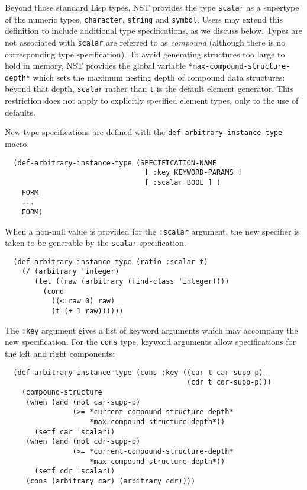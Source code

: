 Beyond those standard Lisp types, NST provides the type
\texttt{scalar} as a supertype of the numeric types,
\texttt{character}, \texttt{string} and \texttt{symbol}.  Users may
extend this definition to include additional type specifications, as
we discuss below.  Types are not associated with \texttt{scalar} are
referred to as \emph{compound} (although there is no corresponding
type specification).  To avoid generating structures too large to hold
in memory, NST provides the global variable
\texttt{*max-compound-structure-depth*}\label{max-compound-structure-depth}
which sets the maximum nesting depth of compound data structures:
beyond that depth, \texttt{scalar} rather than \texttt{t} is the
default element generator.  This restriction does not apply to
explicitly specified element types, only to the use of defaults.

New type specifications are defined with the
\texttt{def-arbitrary-instance-type}
macro.
\label{def-arbitrary-instance-type}
\begin{verbatim}
  (def-arbitrary-instance-type (SPECIFICATION-NAME
                                 [ :key KEYWORD-PARAMS ]
                                 [ :scalar BOOL ] )
    FORM
    ...
    FORM)
\end{verbatim}
When a non-null value is provided for the \texttt{:scalar} argument,
the new specifier is taken to be generable by the \texttt{scalar}
specification.
\begin{verbatim}
  (def-arbitrary-instance-type (ratio :scalar t)
    (/ (arbitrary 'integer)
       (let ((raw (arbitrary (find-class 'integer))))
         (cond
           ((< raw 0) raw)
           (t (+ 1 raw))))))
\end{verbatim}
The \texttt{:key} argument gives a list of keyword arguments which may
accompany the new specification.  For the \texttt{cons} type, keyword
arguments allow specifications for the left and right components:
\begin{verbatim}
  (def-arbitrary-instance-type (cons :key ((car t car-supp-p)
                                           (cdr t cdr-supp-p)))
    (compound-structure
     (when (and (not car-supp-p)
                (>= *current-compound-structure-depth*
                    *max-compound-structure-depth*))
       (setf car 'scalar))
     (when (and (not cdr-supp-p)
                (>= *current-compound-structure-depth*
                    *max-compound-structure-depth*))
       (setf cdr 'scalar))
     (cons (arbitrary car) (arbitrary cdr))))
\end{verbatim}

